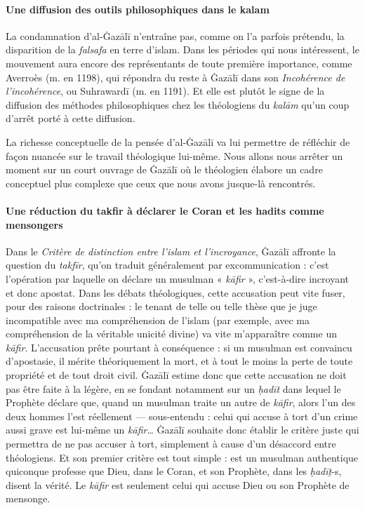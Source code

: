 \paragraph{Une diffusion des outils philosophiques dans le kalam}La condamnation d'al-Ġazālī n'entraîne pas, comme on l'a parfois
prétendu, la disparition de la \emph{falsafa} en terre d'islam. Dans les
périodes qui nous intéressent, le mouvement aura encore des
représentants de toute première importance, comme Averroès (m. en 1198),
qui répondra du reste à Ġazālī dans son \emph{Incohérence de
l'incohérence}, ou Suhrawardī (m. en 1191). Et elle est plutôt le signe
de la diffusion des méthodes philosophiques chez les théologiens du
\emph{kalām} qu'un coup d'arrêt porté à cette diffusion.

La richesse conceptuelle de la pensée d'al-Ġazālī va lui permettre de
réfléchir de façon nuancée sur le travail théologique lui-même. Nous
allons nous arrêter un moment sur un court ouvrage de Ġazālī où le
théologien élabore un cadre conceptuel plus complexe que ceux que nous
avons jusque-là rencontrés.

\paragraph{Une réduction du takfir à déclarer le Coran et les hadits comme mensongers}Dans le \emph{Critère de distinction entre l'islam et l'incroyance},
Ġazālī affronte la question du \emph{takfīr}, qu'on traduit généralement
par excommunication : c'est l'opération par laquelle on déclare un
musulman « \emph{kāfir} », c'est-à-dire incroyant et donc apostat. Dans
les débats théologiques, cette accusation peut vite fuser, pour des
raisons doctrinales : le tenant de telle ou telle thèse que je juge
incompatible avec ma compréhension de l'islam (par exemple, avec ma
compréhension de la véritable unicité divine) va vite m'apparaître comme
un \emph{kāfir}. L'accusation prête pourtant à conséquence : si un
musulman est convaincu d'apostasie, il mérite théoriquement la mort, et
à tout le moins la perte de toute propriété et de tout droit civil.
Ġazālī estime donc que cette accusation ne doit pas être faite à la
légère, en se fondant
notamment sur un \emph{ḥadīt} dans lequel le Prophète déclare que, quand
un musulman traite un autre de \emph{kāfir}, alors l'un des deux hommes
l'est réellement --- sous-entendu : celui qui accuse à tort d'un crime
aussi grave est lui-même un \emph{kāfir}\ldots{} Ġazālī souhaite donc
établir le critère juste qui permettra de ne pas accuser à tort,
simplement à cause d'un désaccord entre théologiens. Et son premier
critère est tout simple : est un musulman authentique quiconque professe
que Dieu, dans le Coran, et son Prophète, dans les \emph{ḥadīṯ}-s,
disent la vérité. Le \emph{kāfir} est seulement celui qui accuse Dieu ou
son Prophète de mensonge.

